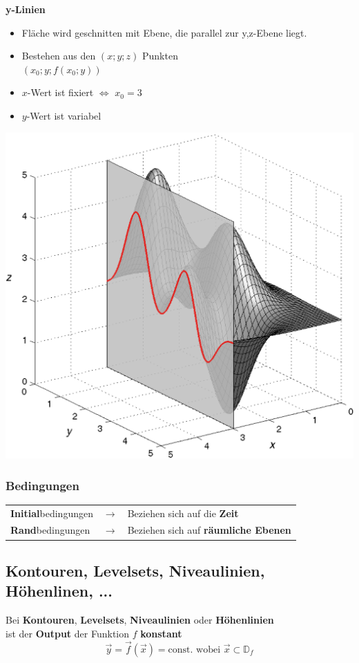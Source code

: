 \hfill
\begin{minipage}[t]{0.48\columnwidth}
    \textbf{y-Linien}
    \begin{itemize}
        \item Fläche wird geschnitten mit Ebene, die parallel zur y,z-Ebene liegt.
        \item Bestehen aus den $(x;y;z)$ Punkten\\
        $(x_0;y;f(x_0;y))$
        \item $x$-Wert ist fixiert $\Leftrightarrow$ $x_0 = 3$
        \item $y$-Wert ist variabel
    \end{itemize}
    \includegraphics[width=\columnwidth]{images/schnitt_x0.png}
\end{minipage}

\subsubsection{Bedingungen}

\begin{tabular}{l l l}
    \textbf{Initial}bedingungen & $\rightarrow$ & Beziehen sich auf die \textbf{Zeit}\\
    \textbf{Rand}bedingungen & $\rightarrow$ & Beziehen sich auf \textbf{räumliche Ebenen}
\end{tabular}

\subsection{Kontouren, Levelsets, Niveaulinien, Höhenlinen, ...}
Bei \textbf{Kontouren}, \textbf{Levelsets}, \textbf{Niveaulinien} oder \textbf{Höhenlinien}\\
ist der \textbf{Output} der Funktion ${f}$ \textbf{konstant}\\
$$\vec{y} = \vec{f}(\vec{x}) = \text{const. wobei } \vec{x} \subset \mathbb{D}_f$$


